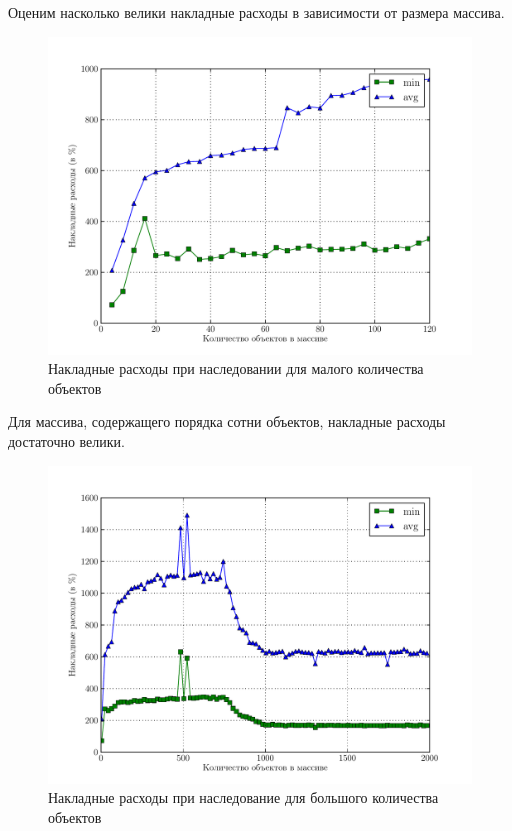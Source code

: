 \documentclass[12pt, a4paper, utf8]{article}
\begin{document}
Оценим насколько велики накладные расходы в зависимости от размера массива.

\begin{figure}[H]
\centering
\includegraphics[width=\textwidth]{apps/compare_virtual_methods_l.pdf}
\caption[Накладные расходы при наследовании $\No$1]{Накладные расходы при наследовании для малого количества объектов}\label{fig:compare_virtual_methods_1}
\end{figure}

Для массива, содержащего порядка сотни объектов, накладные расходы достаточно велики.

\begin{figure}[H]
\centering
\includegraphics[width=\textwidth]{apps/compare_virtual_methods_b.pdf}
\caption[Накладные расходы при наследование $\No$2]{Накладные расходы при наследование для большого количества объектов}\label{fig:compare_virtual_methods_2}
\end{figure}
\end{document}
